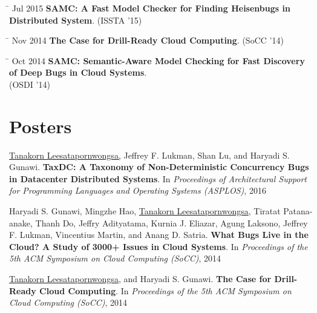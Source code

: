 \documentclass[10pt]{article} %
\begin{document}
\begin{tabbing}
\hspace{2.5cm} \= \kill
Jul 2015 \> \textbf{SAMC: A Fast Model Checker for Finding Heisenbugs in Distributed System}. (ISSTA '15)
\end{tabbing}

\begin{tabbing}
\hspace{2.5cm} \= \kill
Nov 2014 \> \textbf{The Case for Drill-Ready Cloud Computing}. (SoCC '14)
\end{tabbing}

\begin{tabbing}
\hspace{2.5cm} \= \kill
Oct 2014 \> \textbf{SAMC: Semantic-Aware Model Checking for Fast Discovery of Deep Bugs in Cloud Systems}. \\
\> (OSDI '14)
\end{tabbing}


\section{Posters}

\underline{Tanakorn Leesatapornwongsa,} Jeffrey F. Lukman, Shan Lu, and Haryadi
S. Gunawi. \textbf{TaxDC: A Taxonomy of Non-Deterministic Concurrency Bugs in
Datacenter Distributed Systems}. In \textit{Proceedings of Architectural
Support for Programming Languages and Operating Systems (ASPLOS)}, 2016
\vspace{2mm}

Haryadi S. Gunawi, Mingzhe Hao, \underline{Tanakorn Leesatapornwongsa}, Tiratat
Patana-anake, Thanh Do, Jeffry Adityatama, Kurnia J. Eliazar, Agung Laksono,
Jeffrey F. Lukman, Vincentius Martin, and Anang D. Satria. \textbf{What Bugs
Live in the Cloud? A Study of 3000+ Issues in Cloud Systems}. In
\textit{Proceedings of the 5th ACM Symposium on Cloud Computing (SoCC)}, 2014
\vspace{2mm}

\underline{Tanakorn Leesatapornwongsa,} and Haryadi S. Gunawi. \textbf{The Case
for Drill-Ready Cloud Computing}. In \textit{Proceedings of the 5th ACM
Symposium on Cloud Computing (SoCC)}, 2014
\vspace{2mm}
\end{document}
